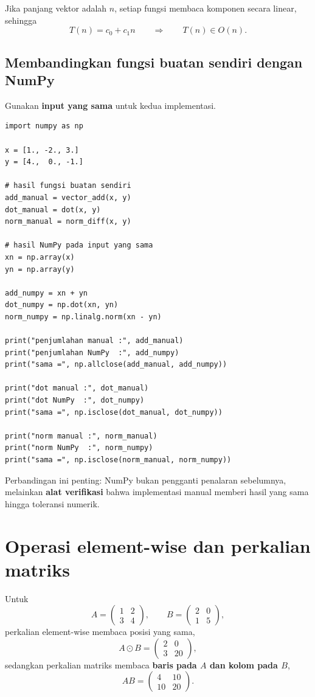 \documentclass[11pt,a4paper]{report}
\begin{document}
Jika panjang vektor adalah $n$, setiap fungsi membaca komponen secara linear, sehingga
\[
T(n)=c_0+c_1n
\qquad\Longrightarrow\qquad
T(n)\in O(n).
\]

\subsection*{Membandingkan fungsi buatan sendiri dengan NumPy}
Gunakan \textbf{input yang sama} untuk kedua implementasi.
\begin{lstlisting}
import numpy as np

x = [1., -2., 3.]
y = [4.,  0., -1.]

# hasil fungsi buatan sendiri
add_manual = vector_add(x, y)
dot_manual = dot(x, y)
norm_manual = norm_diff(x, y)

# hasil NumPy pada input yang sama
xn = np.array(x)
yn = np.array(y)

add_numpy = xn + yn
dot_numpy = np.dot(xn, yn)
norm_numpy = np.linalg.norm(xn - yn)

print("penjumlahan manual :", add_manual)
print("penjumlahan NumPy  :", add_numpy)
print("sama =", np.allclose(add_manual, add_numpy))

print("dot manual :", dot_manual)
print("dot NumPy  :", dot_numpy)
print("sama =", np.isclose(dot_manual, dot_numpy))

print("norm manual :", norm_manual)
print("norm NumPy  :", norm_numpy)
print("sama =", np.isclose(norm_manual, norm_numpy))
\end{lstlisting}

Perbandingan ini penting: NumPy bukan pengganti penalaran sebelumnya, melainkan \textbf{alat verifikasi} bahwa implementasi manual memberi hasil yang sama hingga toleransi numerik.

\section{Operasi element-wise dan perkalian matriks}
Untuk
\[
A=\begin{pmatrix}1&2\\3&4\end{pmatrix},\qquad
B=\begin{pmatrix}2&0\\1&5\end{pmatrix},
\]
perkalian element-wise membaca posisi yang sama,
\[
A\odot B=
\begin{pmatrix}2&0\\3&20\end{pmatrix},
\]
sedangkan perkalian matriks membaca \textbf{baris pada $A$ dan kolom pada $B$},
\[
AB=
\begin{pmatrix}4&10\\10&20\end{pmatrix}.
\]
\end{document}
